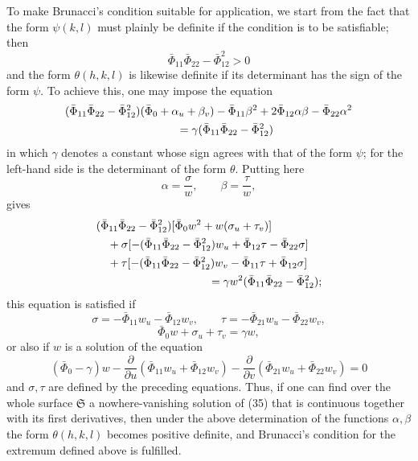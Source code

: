 \documentclass[11pt,a4paper,leqno]{article}
\begin{document}
To make Brunacci's condition suitable for application, we start from the
fact that the form $\psi(k,l)$ must plainly be definite if the condition is
to be satisfiable; then
\[
\bar\Phi_{11}\bar\Phi_{22}-\bar\Phi_{12}^{2}>0
\]
and the form $\theta(h,k,l)$ is likewise definite if its determinant has the
sign of the form $\psi$. To achieve this, one may impose the equation
\[
\begin{aligned}
&(\bar\Phi_{11}\bar\Phi_{22}-\bar\Phi_{12}^{2})
(\bar\Phi_0+\alpha_u+\beta_v)-\bar\Phi_{11}\beta^2
+2\bar\Phi_{12}\alpha\beta-\bar\Phi_{22}\alpha^2\\
&\hspace{35mm}=\gamma
(\bar\Phi_{11}\bar\Phi_{22}-\bar\Phi_{12}^{2})
\end{aligned}
\]
in which $\gamma$ denotes a constant whose sign agrees with that of the form
$\psi$; for the left-hand side is the determinant of the form $\theta$.
Putting here
\[
\alpha=\frac{\sigma}{w},\qquad \beta=\frac{\tau}{w},
\]
gives
\[
\begin{aligned}
&(\bar\Phi_{11}\bar\Phi_{22}-\bar\Phi_{12}^{2})
[\bar\Phi_0w^2+w(\sigma_u+\tau_v)]\\
&\quad+\sigma[-(\bar\Phi_{11}\bar\Phi_{22}-\bar\Phi_{12}^{2})w_u
+\bar\Phi_{12}\tau-\bar\Phi_{22}\sigma]\\
&\quad+\tau[-(\bar\Phi_{11}\bar\Phi_{22}-\bar\Phi_{12}^{2})w_v
-\bar\Phi_{11}\tau+\bar\Phi_{12}\sigma]\\
&\hspace{35mm}=\gamma w^2
(\bar\Phi_{11}\bar\Phi_{22}-\bar\Phi_{12}^{2});
\end{aligned}
\]
this equation is satisfied if
\[
\sigma=-\bar\Phi_{11}w_u-\bar\Phi_{12}w_v,\qquad
\tau=-\bar\Phi_{21}w_u-\bar\Phi_{22}w_v,
\]
\[
\bar\Phi_0w+\sigma_u+\tau_v=\gamma w,
\]
or also if $w$ is a solution of the equation
\begin{equation}\tag{35}
(\bar\Phi_0-\gamma)w
-\frac{\partial}{\partial u}(\bar\Phi_{11}w_u+\bar\Phi_{12}w_v)
-\frac{\partial}{\partial v}(\bar\Phi_{21}w_u+\bar\Phi_{22}w_v)=0
\end{equation}
and $\sigma,\tau$ are defined by the preceding equations. Thus, if one can
find over the whole surface $\mathfrak{S}$ a nowhere-vanishing solution of
(35) that is continuous together with its first derivatives, then under the
above determination of the functions $\alpha,\beta$ the form
$\theta(h,k,l)$ becomes positive definite, and Brunacci's condition for the
extremum defined above is fulfilled.
\end{document}
